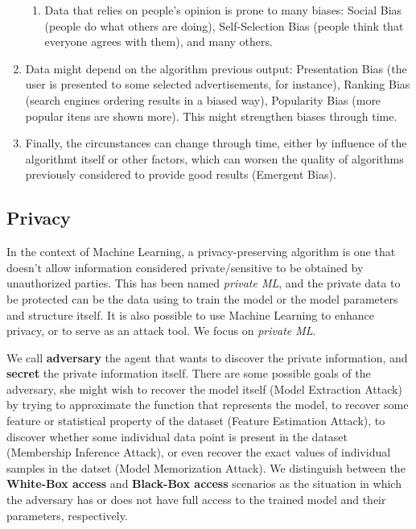 \begin{enumerate}
\begin{enumerate}
    \item Data that relies on people's opinion is prone to many biases: Social Bias (people do what others are doing), Self-Selection Bias (people think that everyone agrees with them), and many others.
    \end{enumerate}
\item Data might depend on the algorithm previous output: Presentation Bias (the user is presented to some selected advertisements, for instance), Ranking Bias (search engines ordering results in a biased way), Popularity Bias (more popular itens are shown more). This might strengthen biases through time. 
\item Finally, the circunstances can change through time, either by influence of the algorithmt itself or other factors, which can worsen the quality of algorithms previously considered to provide good results (Emergent Bias).
\end{enumerate}


\subsection{Privacy}



In the context of Machine Learning, a privacy-preserving algorithm is one that doesn't allow information considered private/sensitive to be obtained by unauthorized parties. This has been named \textit{private ML}\cite{WMLMPASAO}, and the private data to be protected can be the data using to train the model or the model parameters and structure itself. It is also possible to use Machine Learning to enhance privacy, or to serve as an attack tool. We focus on \textit{private ML}. 

We call \textbf{adversary} the agent that wants to discover the private information, and \textbf{secret} the private information itself. There are some possible goals of the adversary, she might wish to recover the model itself (Model Extraction Attack) by trying to approximate the function that represents the model, to recover some feature or statistical property of the dataset (Feature Estimation Attack), to discover whether some individual data point is present in the dataset (Membership Inference Attack), or even recover the exact values of individual samples in the datset (Model Memorization Attack). We distinguish between the \textbf{White-Box access} and \textbf{Black-Box access} scenarios as the situation in which the adversary has or does not have full access to the trained model and their parameters, respectively.

